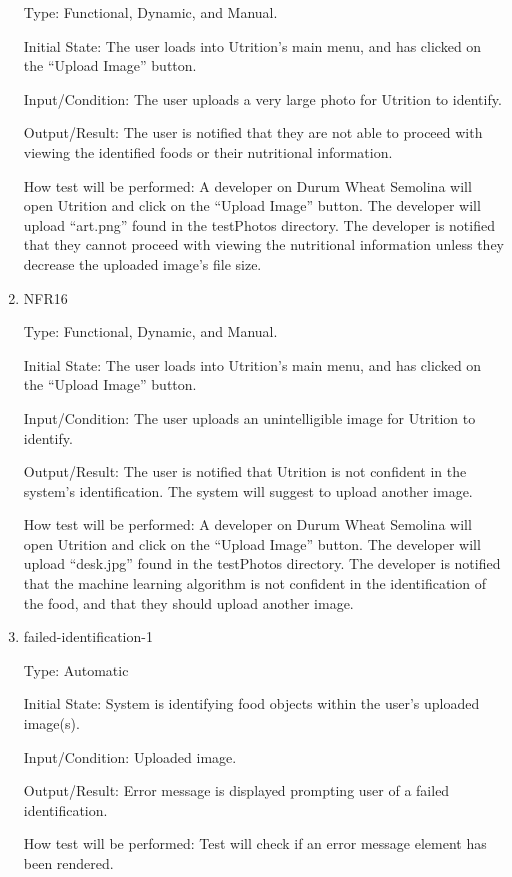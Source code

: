 \documentclass[12pt, titlepage]{article}
\begin{document}
\begin{enumerate}
		Type: Functional, Dynamic, and Manual.
		
		Initial State: The user loads into Utrition’s main menu, and has clicked on the “Upload Image” button.
		
		Input/Condition: The user uploads a very large photo for Utrition to identify.
		
		Output/Result: The user is notified that they are not able to proceed with viewing the identified foods or their nutritional information.
		
		How test will be performed: A developer on Durum Wheat Semolina will open Utrition and click on the “Upload Image” button. The developer will upload “art.png” found in the testPhotos directory. The developer is notified that they cannot proceed with viewing the nutritional information unless they decrease the uploaded image’s file size.
		
		\item{NFR16\\} 
		
		Type: Functional, Dynamic, and Manual.
		
		Initial State: The user loads into Utrition’s main menu, and has clicked on the “Upload Image” button.
		
		Input/Condition: The user uploads an unintelligible image for Utrition to identify.
		
		Output/Result: The user is notified that Utrition is not confident in the system’s identification. The system will suggest to upload another image.
		
		How test will be performed: A developer on Durum Wheat Semolina will 
		open Utrition and click on the “Upload Image” button. The developer 
		will upload “desk.jpg” found in the testPhotos directory. The developer 
		is notified that the machine learning algorithm is not confident in the 
		identification of the food, and that they should upload another image.
		
		\item{failed-identification-1\\}
		
		Type: Automatic
		
		Initial State: System is identifying food objects within the user's 
		uploaded image(s).
		
		Input/Condition: Uploaded image.
		
		Output/Result: Error message is displayed prompting user of a failed 
		identification.
		
		How test will be performed: Test will check if an error message element 
		has been rendered.
		

\end{enumerate}
\end{document}
